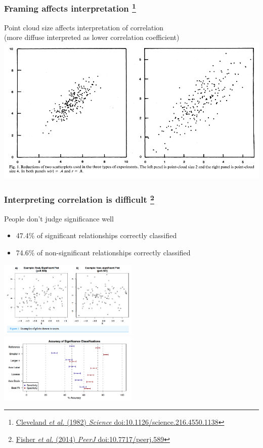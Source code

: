 \begin{frame}
  \frametitle{Framing affects interpretation
  \footnote{\tiny{\href{http://dx.doi.org/10.1126/science.216.4550.1138}{Cleveland \textit{et al.} (1982) \textit{Science} doi:10.1126/science.216.4550.1138}}}
  }
  \textcolor{hutton_green}{Point cloud size affects interpretation of correlation} \\
  \textcolor{hutton_blue}{(more diffuse interpreted as lower correlation coefficient)}
  \includegraphics[width=1\textwidth]{images/scatterplot_framing}    
\end{frame}

\begin{frame}
  \frametitle{Interpreting correlation is difficult
  \footnote{\tiny{\href{http://dx.doi.org/10.7717/peerj.589}{Fisher \textit{et al.} (2014) \textit{PeerJ} doi:10.7717/peerj.589}}}
  }
  \begin{alertblock}{People don't judge significance well}
    \begin{itemize}
      \item 47.4\% of significant relationships correctly classified
      \item 74.6\% of non-significant relationships correctly classified
    \end{itemize}
  \end{alertblock}
  \includegraphics[width=0.5\textwidth]{images/scatterplot_fisher1}    
  \includegraphics[width=0.5\textwidth]{images/scatterplot_fisher2}    
\end{frame}